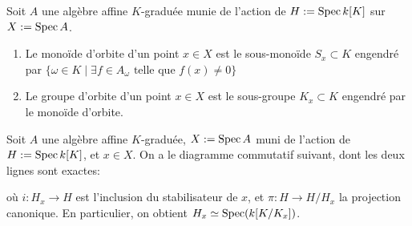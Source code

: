 \begin{defn}
Soit $A$ une algèbre affine $K$-graduée munie de l'action de $H:=\operatorname{Spec} k[K]$ sur $X:=\operatorname{Spec} A$.
\begin{enumerate}
\item Le monoïde d'orbite d'un point $x\in X$ est le sous-monoïde $S_x\subset K$ engendré par $\lbrace\omega \in K\mid \exists f\in A_{\omega} \textrm{ telle que } f(x)\neq 0\rbrace$
\item Le groupe d'orbite d'un point $x\in X$ est le sous-groupe $K_x\subset K$ engendré par le monoïde d'orbite.
\end{enumerate}
\end{defn}

\begin{prop}\label{staborbitegroup}
Soit $A$ une algèbre affine $K$-graduée, $X:=\operatorname{Spec} A$ muni de l'action de $H:=\operatorname{Spec} k[K]$, et $x\in X$. On a le diagramme commutatif suivant, dont les deux lignes sont exactes:
	\begin{center}
	\end{center}
	où $i:H_x\rightarrow H$ est l'inclusion du stabilisateur de $x$, et $\pi:H\rightarrow H/H_x$ la projection canonique. En particulier, on obtient $H_x\simeq \operatorname{Spec}(k[K/K_x])$.
\end{prop}
